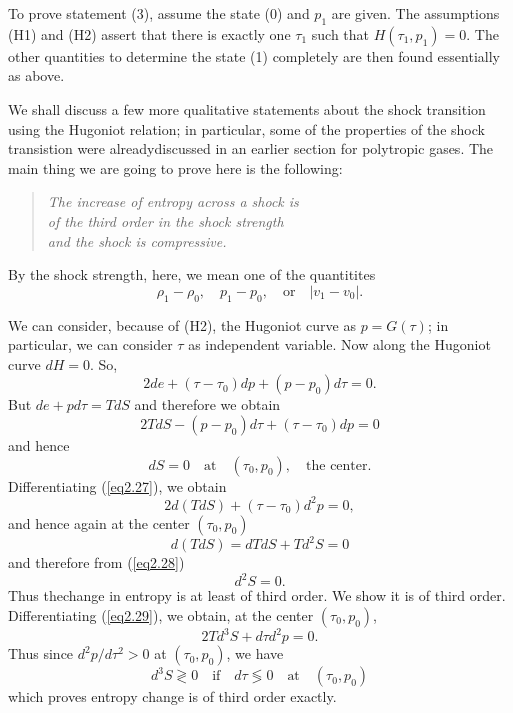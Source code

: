 To prove statement (3), assume the state (0) and $p_1$ are given. The assumptions (H1)
 and (H2) assert that there is exactly one $\tau_1$ such that $H(\tau_1, p_1) = 0$. The other quantities to determine the state (1) completely are then found essentially as above.

We shall discuss a few more qualitative statements about the shock transition using the Hugoniot relation; in particular, some of the properties of the shock transistion were already\pageoriginale discussed  in an earlier section for polytropic gases. The main thing we are going to prove here is the following:
\begin{center}
\begin{quote}
\textit{The increase of entropy across a shock is}\\
\textit{of the third order in the shock strength}\\
\textit{and the shock is compressive.}
\end{quote}
\end{center}
By the shock strength, here, we mean one of the quantitites
$$
\rho_1 - \rho_0, \quad p_1 - p_0, \quad \text{or} \quad |v_1 - v_0|. 
$$

We can consider, because of (H2), the Hugoniot curve as $p = G(\tau)$; in particular, we can consider $\tau$ as independent variable. Now along the Hugoniot curve $dH=0$. So,
$$
2de + (\tau - \tau_0) dp + (p-p_0) d\tau = 0. 
$$
But $de + pd\tau = TdS$ and therefore we obtain
\begin{equation*}
2TdS - (p-p_0) d\tau  + (\tau - \tau_0) dp = 0
\tag{2.27}\label{eq2.27}
\end{equation*}
and hence
\begin{equation*}
dS = 0 \quad \text{at} \quad (\tau_0, p_0), \quad \text{the center}. \tag{2.28}\label{eq2.28}
\end{equation*}
Differentiating (\ref{eq2.27}), we obtain
\begin{equation*}
2d (TdS) +(\tau - \tau_0) d^2 p =0,\tag{2.29}\label{eq2.29}
\end{equation*}
and hence again at the center $(\tau_0, p_0)$
$$
d(TdS) = dTdS + Td^2 S = 0
$$
and therefore from (\ref{eq2.28})
$$
d^2 S = 0.
$$
Thus the\pageoriginale change in entropy is at least of third order. We show it is of third order. Differentiating (\ref{eq2.29}), we obtain, at the center $(\tau_0, p_0)$,
$$
2Td^3 S + d \tau d^2p =0.
$$
Thus since $d^2 p/d\tau^2 >0$ at $(\tau_0, p_0)$, we have
$$
d^3 S \gtrless 0 \quad \text{if} \quad d\tau \lessgtr 0 \quad \text{at} \quad (\tau_0, p_0)
$$
which proves entropy change is of third order exactly.

